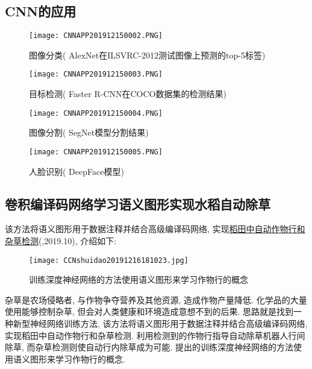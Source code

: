 \subsection{CNN的应用}
\begin{figure}[H]
\centering
\texttt{[image: CNNAPP201912150002.PNG]}
\caption{图像分类( AlexNet在ILSVRC-2012测试图像上预测的top-5标签)}
\label{CNNAPP201912150002}
\end{figure}
\begin{figure}[H]
\centering
\texttt{[image: CNNAPP201912150003.PNG]}
\caption{目标检测( Faster R-CNN在COCO数据集的检测结果)}
\label{CNNAPP201912150003}
\end{figure}
\begin{figure}[H]
\centering
\texttt{[image: CNNAPP201912150004.PNG]}
\caption{图像分割( SegNet模型分割结果)}
\label{CNNAPP201912150004}
\end{figure}
\begin{figure}[H]
\centering
\texttt{[image: CNNAPP201912150005.PNG]}
\caption{人脸识别( DeepFace模型)}
\label{CNNAPP201912150005}
\end{figure}
\subsection{卷积编译码网络学习语义图形实现水稻自动除草}
该方法将语义图形用于数据注释并结合高级编译码网络, 实现\href{https://doi.org/10.3389/fpls.2019.01404}{稻田中自动作物行和杂草检测}(\cite{Adhikari-2019},2019.10), 介绍如下:
\begin{figure}[H]
\centering
\texttt{[image: CCNshuidao20191216181023.jpg]}
\caption{训练深度神经网络的方法使用语义图形来学习作物行的概念}
\label{CCNshuidao20191216181023}
\end{figure}
杂草是农场侵略者, 与作物争夺营养及其他资源, 造成作物产量降低. 化学品的大量使用能够控制杂草, 但会对人类健康和环境造成意想不到的后果.
思路就是找到一种新型神经网络训练方法, 该方法将语义图形用于数据注释并结合高级编译码网络, 实现稻田中自动作物行和杂草检测.
利用检测到的作物行指导自动除草机器人行间除草, 而杂草检测则使自动行内除草成为可能. 提出的训练深度神经网络的方法使用语义图形来学习作物行的概念.

